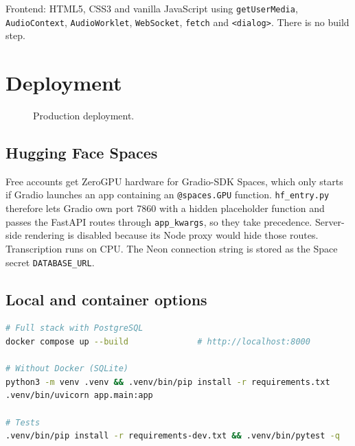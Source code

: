 \documentclass[11pt,a4paper]{article}
\begin{document}
Frontend: HTML5, CSS3 and vanilla JavaScript using \texttt{getUserMedia}, \texttt{AudioContext},
\texttt{AudioWorklet}, \texttt{WebSocket}, \texttt{fetch} and \texttt{<dialog>}. There is no build step.

\section{Deployment}

\begin{figure}[H]
\centering
{}
\caption{Production deployment.}
\end{figure}

\subsection{Hugging Face Spaces}
Free accounts get ZeroGPU hardware for Gradio-SDK Spaces, which only starts if Gradio launches an app
containing an \texttt{@spaces.GPU} function. \texttt{hf\_entry.py} therefore lets Gradio own port 7860
with a hidden placeholder function and passes the FastAPI routes through \texttt{app\_kwargs}, so they
take precedence. Server-side rendering is disabled because its Node proxy would hide those routes.
Transcription runs on CPU. The Neon connection string is stored as the Space secret \texttt{DATABASE\_URL}.

\subsection{Local and container options}
\begin{lstlisting}[language=bash]
# Full stack with PostgreSQL
docker compose up --build              # http://localhost:8000

# Without Docker (SQLite)
python3 -m venv .venv && .venv/bin/pip install -r requirements.txt
.venv/bin/uvicorn app.main:app

# Tests
.venv/bin/pip install -r requirements-dev.txt && .venv/bin/pytest -q
\end{lstlisting}
\end{document}

